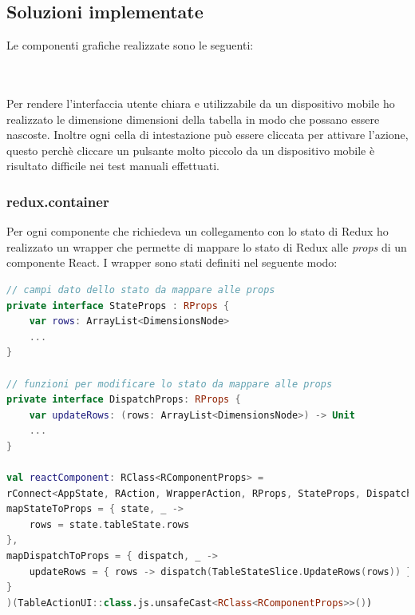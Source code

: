 \subsection{Soluzioni implementate}
Le componenti grafiche realizzate sono le seguenti: \\
\begin{minipage}{\linewidth}
\end{minipage}
\\
\\
Per rendere l'interfaccia utente chiara e utilizzabile da un dispositivo mobile ho realizzato le dimensione dimensioni della tabella in modo che possano essere nascoste. Inoltre ogni cella di intestazione può essere cliccata per attivare l'azione, questo perchè cliccare un pulsante molto piccolo da un dispositivo mobile è risultato difficile nei test manuali effettuati.

\subsubsection{redux.container}
Per ogni componente che richiedeva un collegamento con lo stato di Redux ho realizzato un wrapper che permette di mappare lo stato di Redux alle \emph{props} di un componente React. I wrapper sono stati definiti nel seguente modo:
\begin{lstlisting}[caption={BodyCells}, label={lst:bodycells}, language=Kotlin]
// campi dato dello stato da mappare alle props
private interface StateProps : RProps {
	var rows: ArrayList<DimensionsNode>
	...
}

// funzioni per modificare lo stato da mappare alle props
private interface DispatchProps: RProps {
	var updateRows: (rows: ArrayList<DimensionsNode>) -> Unit
	...
}

val reactComponent: RClass<RComponentProps> =
rConnect<AppState, RAction, WrapperAction, RProps, StateProps, DispatchProps, RComponentProps>(
mapStateToProps = { state, _ ->
	rows = state.tableState.rows
},
mapDispatchToProps = { dispatch, _ ->
	updateRows = { rows -> dispatch(TableStateSlice.UpdateRows(rows)) }
}
)(TableActionUI::class.js.unsafeCast<RClass<RComponentProps>>())
\end{lstlisting}
